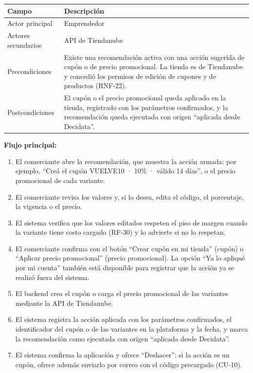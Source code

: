 \begin{table}[h]
\centering
\renewcommand{\arraystretch}{1.3}
\begin{tabular}{|m{3cm}|m{11.3cm}|}
\hline
\textbf{Campo} & \textbf{Descripción} \\
\hline
Actor principal & Emprendedor \\
\hline
Actores secundarios & API de Tiendanube \\
\hline
Precondiciones & Existe una recomendación activa con una acción sugerida de cupón o de precio promocional. La tienda es de Tiendanube y concedió los permisos de edición de cupones y de productos (RNF-22). \\
\hline
Postcondiciones & El cupón o el precio promocional queda aplicado en la tienda, registrado con los parámetros confirmados, y la recomendación queda ejecutada con origen \enquote{aplicada desde Decidata}. \\
\hline
\end{tabular}
\end{table}

\noindent\textbf{Flujo principal:}
\begin{enumerate}
    \item El comerciante abre la recomendación, que muestra la acción armada: por ejemplo, \enquote{Creá el cupón VUELVE10 · 10\% · válido 14 días}, o el precio promocional de cada variante.
    \item El comerciante revisa los valores y, si lo desea, edita el código, el porcentaje, la vigencia o el precio.
    \item El sistema verifica que los valores editados respeten el piso de margen cuando la variante tiene costo cargado (RF-30) y lo advierte si no lo respetan.
    \item El comerciante confirma con el botón \enquote{Crear cupón en mi tienda} (cupón) o \enquote{Aplicar precio promocional} (precio promocional). La opción \enquote{Ya lo apliqué por mi cuenta} también está disponible para registrar que la acción ya se realizó fuera del sistema.
    \item El backend crea el cupón o carga el precio promocional de las variantes mediante la API de Tiendanube.
    \item El sistema registra la acción aplicada con los parámetros confirmados, el identificador del cupón o de las variantes en la plataforma y la fecha, y marca la recomendación como ejecutada con origen \enquote{aplicada desde Decidata}.
    \item El sistema confirma la aplicación y ofrece \enquote{Deshacer}; si la acción es un cupón, ofrece además enviarlo por correo con el código precargado (CU-10).
\end{enumerate}

